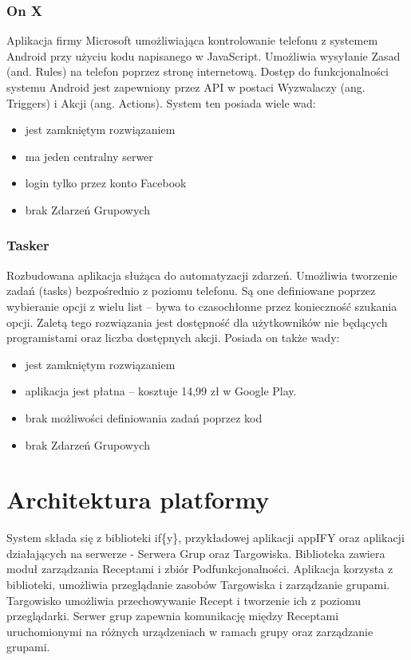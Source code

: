\documentclass[11pt,a4paper,polish,thesis]{dcsbook}
\begin{document}
\subsection{On X\cite{onx}}
Aplikacja firmy Microsoft umożliwiająca kontrolowanie telefonu z systemem Android przy użyciu kodu napisanego w JavaScript. Umożliwia wysyłanie Zasad (and. Rules) na
telefon poprzez stronę internetową. Dostęp do funkcjonalności systemu Android jest zapewniony przez API w postaci Wyzwalaczy (ang. Triggers) i Akcji (ang. Actions).
System ten posiada wiele wad:
\begin{itemize}
\item jest zamkniętym rozwiązaniem
\item ma jeden centralny serwer
\item login tylko przez konto Facebook
\item brak Zdarzeń Grupowych
\end{itemize}

\subsection{Tasker}
Rozbudowana aplikacja służąca do automatyzacji zdarzeń. Umożliwia tworzenie zadań (tasks) bezpośrednio z poziomu telefonu. Są one definiowane poprzez wybieranie opcji z wielu list -- bywa to czasochłonne przez konieczność szukania opcji. Zaletą tego rozwiązania jest dostępność dla użytkowników nie będących programistami oraz liczba dostępnych akcji. Posiada on także wady:
\begin{itemize}
\item jest zamkniętym rozwiązaniem
\item aplikacja jest płatna -- kosztuje 14,99 zł w Google Play. \cite{tasker}
\item brak możliwości definiowania zadań poprzez kod
\item brak Zdarzeń Grupowych
\end{itemize}

\chapter{Architektura platformy}
System składa się z biblioteki if\{y\}, przykładowej aplikacji appIFY oraz aplikacji działających na serwerze - Serwera Grup oraz Targowiska.
Biblioteka zawiera moduł zarządzania Receptami i zbiór Podfunkcjonalności.
Aplikacja korzysta z biblioteki, umożliwia przeglądanie zasobów Targowiska i zarządzanie grupami. 
Targowisko umożliwia przechowywanie Recept i tworzenie ich z poziomu przeglądarki.
Serwer grup zapewnia komunikację między Receptami uruchomionymi na różnych urządzeniach w ramach grupy oraz zarządzanie grupami.
\end{document}
